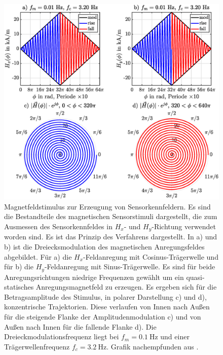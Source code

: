 	
	\clearpage
	\begin{figure}[tbph]
		\centering
		\includegraphics[width=\linewidth]{chapters/images/Magnetfeldstimulus_Kennfeldmethode}
		\caption[Magnetfeldstimulus zur Erzeugung von Sensorkennfeldern]{Magnetfeldstimulus zur Erzeugung von 
		Sensorkennfeldern. Es sind die Bestandteile des magnetischen Sensorstimuli dargestellt, die zum Ausmessen des 
		Sensorkennfeldes in $H_x$- und $H_y$-Richtung verwendet worden sind. Es ist das Prinzip des Verfahrens 
		dargestellt. In a) und b) ist die Dreiecksmodulation des magnetischen Anregungsfeldes abgebildet. Für a) die 
		$H_x$-Feldanregung mit Cosinus-Trägerwelle und für b) die $H_y$-Feldanregung mit Sinus-Trägerwelle. Es sind für 
		beide Anregungsrichtungen niedrige Frequenzen gewählt um ein quasi-statisches Anregungsmagnetfeld zu erzeugen. 
		Es ergeben sich für die Betragsamplitude des Stimulus, in polarer Darstellung c) und d), konzentrische 
		Trajektorien. Diese verlaufen von Innen nach Außen für die steigende Flanke der Amplitudenmodulation c) und von 
		Außen nach Innen für die fallende Flanke d). Die Dreieckmodulationsfrequenz liegt bei $f_m = \SI{0.1}{\hertz}$ 
		und einer Trägerwellenfrequenz $f_c = \SI{3.2}{\hertz}$. Grafik nachempfunden aus \cite{Schuethe2019}.}
		\label{fig:magnetfeldstimuluskennfeldmethode}
	\end{figure}
	

	

